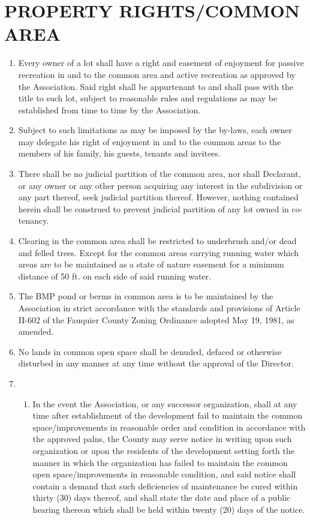 \documentclass[12pt, letterpaper]{article}
\begin{document}
\section{PROPERTY RIGHTS/COMMON AREA}
\begin{enumerate}
\item Every owner of a lot shall have a right and easement of enjoyment for passive recreation in and to the common area and active recreation as approved by the Association.
Said right shall be appurtenant to and shall pass with the title to such lot, subject to reasonable rules and regulations as may be established from time to time by the Association.
\item Subject to such limitations as may be imposed by the by-laws, each owner may delegate his right of enjoyment in and to the common areas to the members of his family, his guests, tenants and invitees.
\item There shall be no judicial partition of the common area, nor shall Declarant, or any owner or any other person acquiring any interest in the subdivision or any part thereof, seek judicial partition thereof.
However, nothing contained herein shall be construed to prevent judicial partition of any lot owned in co-tenancy.
\item Clearing in the common area shall be restricted to underbrush and/or dead and felled trees.
Except for the common areas carrying running water which areas are to be maintained as a state of nature easement for a minimum distance of 50 ft. on each side of said running water.
\item The BMP pond or berms in common area is to be maintained by the Association in strict accordance with the standards and provisions of Article II-602 of the Fauquier County Zoning Ordinance adopted May 19, 1981, as amended.
\item No lands in common open space shall be denuded, defaced or otherwise disturbed in any manner at any time without the approval of the Director.
\item \begin{enumerate}
 \item In the event the Association, or any successor organization, shall at any time after establishment of the development fail to maintain the common space/improvements in reasonable order and condition in accordance with the approved palns, the County may serve notice in writing upon such organization or upon the residents of the development setting forth the manner in which the organization has failed to maintain the common open space/improvements in reasonable condition, and said notice shall contain a demand that such deficiencies of maintenance be cured within thirty (30) days thereof, and shall state the date and place of a public hearing thereon which shall be held within twenty (20) days of the notice.

\end{enumerate}
\end{enumerate}
\end{document}
